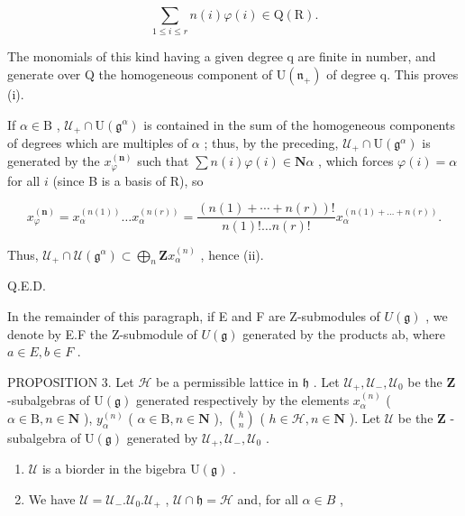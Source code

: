 \[
\sum_ {1 \leq i \leq r} n (i) \varphi (i) \in \mathrm{Q} (\mathrm{R}).
\]

The monomials of this kind having a given degree q are finite in number, and generate over Q the homogeneous component of \(\mathrm{U}(\mathfrak{n}_{+})\) of degree q. This proves (i).

If \(\alpha \in \mathrm{B}\) , \(\mathcal{U}_{+} \cap \mathrm{U}(\mathfrak{g}^{\alpha})\) is contained in the sum of the homogeneous components of degrees which are multiples of \(\alpha\) ; thus, by the preceding, \(\mathcal{U}_{+} \cap \mathrm{U}(\mathfrak{g}^{\alpha})\) is generated by the \(x_{\varphi}^{(\mathbf{n})}\) such that \(\sum n(i)\varphi(i) \in \mathbf{N}\alpha\) , which forces \(\varphi(i) = \alpha\) for all \(i\) (since B is a basis of R), so

\[
x _ {\varphi} ^ {(\mathbf {n})} = x _ {\alpha} ^ {(n (1))} \dots x _ {\alpha} ^ {(n (r))} = \frac {(n (1) + \cdots + n (r)) !}{n (1) ! \dots n (r) !} x _ {\alpha} ^ {(n (1) + \dots + n (r))}.
\]

Thus, \(\mathcal{U}_{+} \cap \mathcal{U}(\mathfrak{g}^{\alpha}) \subset \bigoplus_{n} \mathbf{Z}x_{\alpha}^{(n)}\) , hence (ii).

Q.E.D.

In the remainder of this paragraph, if E and F are Z-submodules of \(U(\mathfrak{g})\) , we denote by E.F the Z-submodule of \(U(\mathfrak{g})\) generated by the products ab, where \(a \in E, b \in F\) .

PROPOSITION 3. Let \(\mathcal{H}\) be a permissible lattice in \(\mathfrak{h}\) . Let \(\mathcal{U}_{+},\mathcal{U}_{-},\mathcal{U}_{0}\) be the \(\mathbf{Z}\) -subalgebras of \(\mathrm{U}(\mathfrak{g})\) generated respectively by the elements \(x_{\alpha}^{(n)}\) ( \(\alpha \in \mathrm{B}, n \in \mathbf{N}\) ), \(y_{\alpha}^{(n)}\) ( \(\alpha \in \mathrm{B}, n \in \mathbf{N}\) ), \(\binom{h}{n}\) ( \(h \in \mathcal{H}, n \in \mathbf{N}\) ). Let \(\mathcal{U}\) be the \(\mathbf{Z}\) -subalgebra of \(\mathrm{U}(\mathfrak{g})\) generated by \(\mathcal{U}_{+},\mathcal{U}_{-},\mathcal{U}_{0}\) .

\begin{enumerate}
\def\labelenumi{(\roman{enumi})}
\item
  \(\mathcal{U}\) is a biorder in the bigebra \(\mathrm{U}(\mathfrak{g})\) .
\item
  We have \(\mathcal{U} = \mathcal{U}_{-}. \mathcal{U}_{0}. \mathcal{U}_{+}\) , \(\mathcal{U} \cap \mathfrak{h} = \mathcal{H}\) and, for all \(\alpha \in B\) ,
\end{enumerate}

